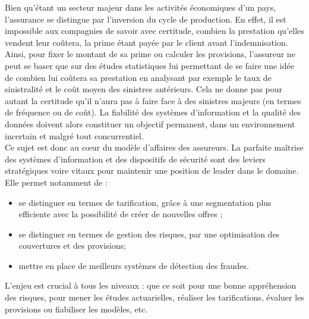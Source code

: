 Bien qu'\'etant un secteur majeur dans les activit\'es \'economiques d'un pays, l'assurance se distingue par l'inversion du cycle de production. En effet, il est impossible aux compagnies de savoir avec certitude, combien la prestation qu’elles vendent leur coûtera, la prime étant payée par le client avant l'indemnisation. Ainsi, pour fixer le montant de sa prime ou calculer les provisions, l’assureur ne peut se baser que sur des études statistiques lui permettant de se faire une idée de combien lui coûtera sa prestation en analysant par exemple le taux de sinistralité et le co\^ut moyen des sinistres ant\'erieurs. Cela ne donne pas pour autant la certitude qu’il n’aura pas à faire face à des sinistres majeurs (en termes de fr\'equence ou de co\^ut). La fiabilité des systèmes d’information et la qualité des données doivent alors constituer un objectif permanent, dans un environnement  incertain et malgr\'e tout concurrentiel.  \\
 

Ce sujet est donc au cœur du modèle d’affaires des assureurs. La parfaite maîtrise des systèmes d’information et des dispositifs de sécurité sont des leviers stratégiques voire vitaux pour maintenir une position de leader dans le domaine. Elle permet notamment de  : 

\begin{itemize}[parsep=0cm,itemsep=0cm]
\item se distinguer en termes de tarification, gr\^ace à une segmentation plus efficiente avec la possibilité de créer de nouvelles offres ;
\item se distinguer en termes de gestion des risques, par une optimisation des couvertures et des provisions;
\item mettre en place de meilleurs systèmes de détection des fraudes.
\end{itemize}    
L’enjeu est crucial à tous les niveaux : que ce soit pour une bonne appréhension des risques, pour mener les études actuarielles, réaliser les tarifications, évaluer les provisions ou fiabiliser les modèles, etc. \\

